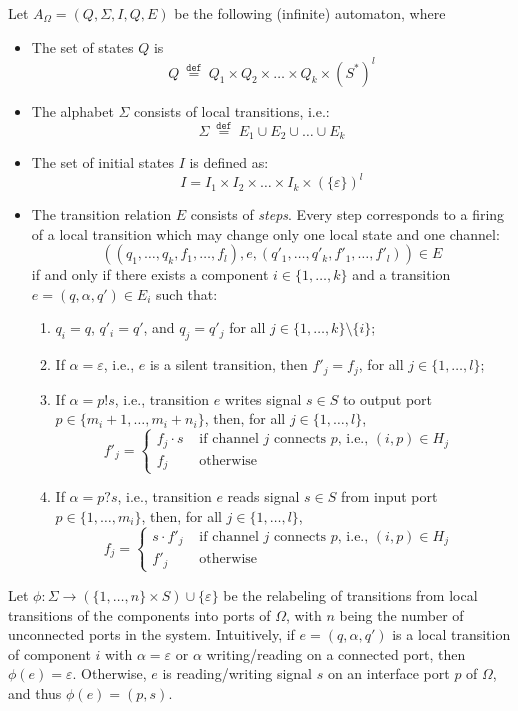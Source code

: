 \documentclass{llncs}
\newcommand{\df}[1]{\ \stackrel{\mathtt{def}}{#1}\ }
\begin{document}
Let $A_{\Omega}= (Q,\Sigma,I,Q,E)$ be the following (infinite)
automaton, where
\begin{itemize}
\item The set of states $Q$ is
\[Q\df{=} Q_1\times Q_2\times\ldots\times Q_k\times (S^\ast)^l\]
\item The alphabet $\Sigma$ consists of local transitions, i.e.:
\[\Sigma\df{=}E_1\cup E_2\cup \ldots\cup E_k\]
\item The set of initial states $I$ is defined as:
  \[I = I_1\times I_2\times\ldots\times I_k\times (\{\varepsilon\})^l\]
\item The transition relation $E$ consists of \emph{steps}. Every step
  corresponds to a firing of a local transition which may change only
  one local state and one channel:
  \[
  ((q_1,\ldots,q_k,f_1,\ldots,f_l),e,(q'_1,\ldots,q'_k,f'_1,\ldots,f'_l))
  \in E
  \] 
  if and only if there exists a component $i\in\{1,\ldots,k\}$ and a
  transition $e=(q,\alpha,q')\in E_i$ such that:
  \begin{enumerate}
  \item $q_i=q$, $q'_i=q'$, and $q_j=q'_j$ for all
    $j\in\{1,\ldots,k\}\setminus\{i\}$;
  \item If $\alpha=\varepsilon$, i.e., $e$ is a silent transition,
    then $f'_j=f_j$, for all $j\in\{1,\ldots,l\}$;
  \item If $\alpha=p!s$, i.e., transition $e$ writes signal $s\in S$
    to output port $p\in\{m_i+1,\ldots,m_i+n_i\}$, then, for all
    $j\in\{1,\ldots,l\}$,
    \[
    f'_j =\left\{\begin{array}{ll}
        f_j\cdot s & \mbox{ if channel $j$ connects $p$, 
          i.e., $(i,p)\in H_j$ } \\
        f_j & \mbox{ otherwise}
      \end{array}
    \right.\]
  \item If $\alpha=p?s$, i.e., transition $e$ reads signal $s\in S$ from
    input port $p\in\{1,\ldots,m_i\}$, then, for all
    $j\in\{1,\ldots,l\}$,
    \[
    f_j =\left\{\begin{array}{ll}
        s \cdot f'_j & \mbox{ if channel $j$ connects $p$, 
          i.e., $(i,p)\in H_j$ } \\
        f'_j & \mbox{ otherwise}
      \end{array}
    \right.\]
  \end{enumerate}
\end{itemize}

Let $\phi:\Sigma\rightarrow (\{1,\ldots,n\}\times S)\cup
\{\varepsilon\}$ be the relabeling of transitions from local
transitions of the components into ports of $\Omega$, with $n$ being
the number of unconnected ports in the system. Intuitively, if
$e=(q,\alpha,q')$ is a local transition of component $i$ with
$\alpha=\varepsilon$ or $\alpha$ writing/reading on a connected port,
then $\phi(e)=\varepsilon$. Otherwise, $e$ is reading/writing
signal $s$ on an interface port $p$ of $\Omega$, and thus
$\phi(e)=(p,s)$.
\end{document}
